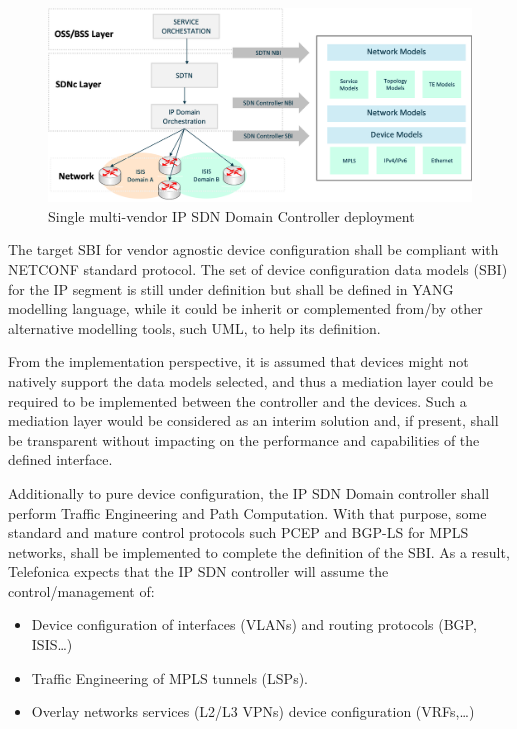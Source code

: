 \documentclass[a4paper,fleqn]{cas-dc}
\begin{document}
\begin{figure}
	\centering
		\includegraphics[scale=0.5]{figs/ifusion_multidomain_2.png}
	\caption{Single multi-vendor IP SDN Domain Controller deployment}
	\label{FIG:2}
\end{figure}

The target SBI for vendor agnostic device configuration shall be compliant with NETCONF \cite{enns2011network} standard protocol. The  set of device configuration data models (SBI) for the IP segment is still under definition but shall be defined in YANG \cite{bjorklund2016yang} modelling language, while it could be inherit or complemented from/by other alternative modelling tools, such UML, to help its definition.

From the implementation perspective, it is assumed that devices might not natively support the data models selected, and thus a mediation layer could be required to be implemented between the controller and the devices. Such a mediation layer would be considered as an interim solution and, if present, shall be transparent without impacting on the performance and capabilities of the defined interface. 

Additionally to pure device configuration, the IP SDN Domain controller shall perform Traffic Engineering and Path Computation. With that purpose, some standard and mature control protocols such PCEP and BGP-LS for MPLS networks, shall be implemented to complete the definition of the SBI. As a result, Telefonica expects that the IP SDN controller will assume the control/management of:
\begin{itemize}
\item Device configuration of interfaces (VLANs) and routing protocols (BGP, ISIS…)
\item Traffic Engineering of MPLS tunnels (LSPs). 
\item Overlay networks services (L2/L3 VPNs) device configuration (VRFs,\dots)
\end{itemize}
\end{document}

